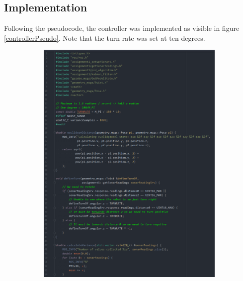\documentclass{article}
\begin{document}
\subsection{Implementation}
Following the pseudocode, the controller was implemented as visible in figure
\ref{controllerPseudo}. Note that the turn rate was set at ten degrees.
\begin{figure}[ht]
    \begin{subfigure}{.5\textwidth}
        \centering
        \includegraphics[scale=0.24]{img/controller1.png}
    \end{subfigure}
    \begin{subfigure}{.5\textwidth}
        \centering

\end{subfigure}
\end{figure}
\end{document}
